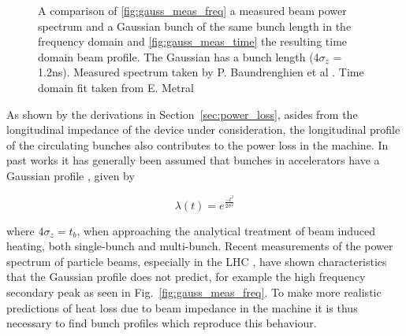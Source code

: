 \begin{figure}
\caption{A comparison of \ref{fig:gauss_meas_freq} a measured beam power spectrum and a Gaussian bunch of the same bunch length in the frequency domain and \ref{fig:gauss_meas_time} the resulting time domain beam profile. The Gaussian has a bunch length (4$\sigma_{z}$ = 1.2ns). Measured spectrum taken by P. Baundrenghien et al \cite{Baudrenghien:LHCPowSpec}. Time domain fit taken from E. Metral \cite{Metral:Heating}}
\label{fig:measured_gauss}
\end{figure}

As shown by the derivations in Section~\ref{sec:power_loss}, asides from the longitudinal impedance of the device under consideration, the longitudinal profile of the circulating bunches also contributes to the power loss in the machine. In past works it has generally been assumed that bunches in accelerators have a Gaussian profile \cite{Grudiev:LongTransSecCol}, given by

\begin{equation}
\lambda \left( t \right) = e^{\frac{-t^{2}}{2\sigma^{2}}}
\label{eqn:gauss}
\end{equation}

where $4\sigma_{z} = t_{b}$, when approaching the analytical treatment of beam induced heating, both single-bunch and multi-bunch. Recent measurements of the power spectrum of particle beams, especially in the LHC \cite{Baudrenghien:LHCPowSpec}, have shown characteristics that the Gaussian profile does not predict, for example the high frequency secondary peak as seen in Fig.~\ref{fig:gauss_meas_freq}. To make more realistic predictions of heat loss due to beam impedance in the machine it is thus necessary to find bunch profiles which reproduce this behaviour.


